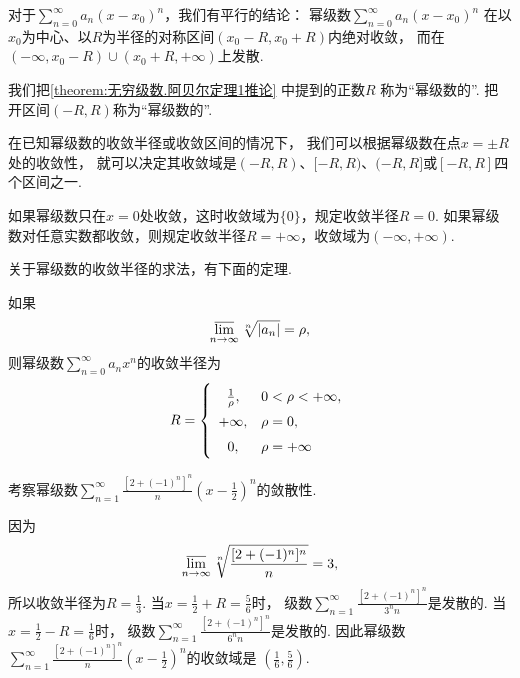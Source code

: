 对于\(\sum_{n=0}^\infty a_n (x-x_0)^n\)，我们有平行的结论：
幂级数\(\sum_{n=0}^\infty a_n (x-x_0)^n\)
在以\(x_0\)为中心、以\(R\)为半径的对称区间\((x_0-R,x_0+R)\)内绝对收敛，
而在\((-\infty,x_0-R)\cup(x_0+R,+\infty)\)上发散.

我们把\cref{theorem:无穷级数.阿贝尔定理1推论} 中提到的正数\(R\)
称为“幂级数的”.
把开区间\((-R,R)\)称为“幂级数的”.

在已知幂级数的收敛半径或收敛区间的情况下，
我们可以根据幂级数在点\(x = \pm R\)处的收敛性，
就可以决定其收敛域是\((-R,R)\)、\([-R,R)\)、\((-R,R]\)或\([-R,R]\)四个区间之一.

如果幂级数只在\(x=0\)处收敛，这时收敛域为\(\{0\}\)，规定收敛半径\(R=0\).
如果幂级数对任意实数都收敛，则规定收敛半径\(R=+\infty\)，收敛域为\((-\infty,+\infty)\).

关于幂级数的收敛半径的求法，有下面的定理.
\begin{theorem}\label{theorem:无穷级数.幂级数的收敛半径的求法1}
如果\[
	\varlimsup_{n\to\infty} \sqrt[n]{\abs{a_n}} = \rho,
\]
则幂级数\(\sum_{n=0}^\infty a_n x^n\)的收敛半径为\[
	R = \left\{ \def\arraystretch{1.5} \begin{array}{cl}
		\frac1\rho, & 0<\rho<+\infty, \\
		+\infty, & \rho = 0, \\
		0, & \rho = +\infty \\
	\end{array} \right.
\]
\end{theorem}

\begin{example}
考察幂级数\(\sum_{n=1}^\infty \frac{[2+(-1)^n]^n}{n} \left(x-\frac12\right)^n\)的敛散性.
\begin{solution}
因为\[
	\varlimsup_{n\to\infty} \sqrt[n]{\frac{[2+(-1)^n]^n}n} = 3,
\]
所以收敛半径为\(R=\frac13\).
当\(x=\frac12+R=\frac56\)时，
级数\(\sum_{n=1}^\infty \frac{[2+(-1)^n]^n}{3^n n}\)是发散的.
当\(x=\frac12-R=\frac16\)时，
级数\(\sum_{n=1}^\infty \frac{[2+(-1)^n]^n}{6^n n}\)是发散的.
因此幂级数\(\sum_{n=1}^\infty \frac{[2+(-1)^n]^n}{n} \left(x-\frac12\right)^n\)的收敛域是
\(\left(\frac16,\frac56\right)\).
\end{solution}
\end{example}

